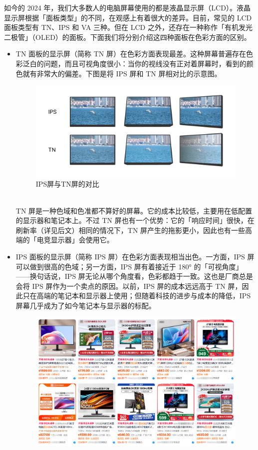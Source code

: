 如今的 2024 年，我们大多数人的电脑屏幕使用的都是液晶显示屏（LCD）。液晶显示屏根据「面板类型」的不同，在观感上有着很大的差异。目前，常见的 LCD 面板类型有 TN、IPS 和 VA 三种。但在 LCD 之外，还存在一种称作「有机发光二极管」（OLED）的面板。下面我们将分别介绍这四种面板在色彩方面的区别。

\begin{itemize}
  \item TN 面板的显示屏（简称 TN 屏）在色彩方面表现最差。这种屏幕普遍存在色彩泛白的问题，而且可视角度很小：当你的视线没有正对着屏幕时，看到的颜色就有非常大的偏差。下图是将 IPS 屏和 TN 屏相对比的示意图。
    \begin{figure}[htb!]
      \centering
      \includegraphics[width=.85\textwidth]{assets/advanced/IPS_vs_TN.pdf}
      \caption{IPS屏与TN屏的对比}
      \label{fig:IPS_vs_TN}
    \end{figure}\\
    TN 屏是一种色域和色准都不算好的屏幕。它的成本比较低，主要用在低配置的显示器和笔记本上。不过 TN 屏也有一个优势：它的「响应时间」很快，在刷新率（详见后文）相同的情况下，TN 屏产生的拖影更小，因此也有一些高端的「电竞显示器」会使用它。
  \item IPS 面板的显示屏（简称 IPS 屏）在色彩方面表现相当出色。一方面，IPS 屏可以做到很高的色域；另一方面，IPS 屏有着接近于 180° 的「可视角度」——换句话说，IPS 屏无论从哪个角度看，色彩都趋于一致。这也是厂商总是会将 IPS 屏作为一个卖点的原因。以前，IPS 屏的成本远远高于 TN 屏，因此只在高端的笔记本和显示器上使用；但随着科技的进步与成本的降低，IPS 屏幕几乎成为了如今笔记本与显示器的标配。
    \begin{figure}[htb!]
      \centering
      \includegraphics[width=.8\textwidth]{assets/advanced/IPS_screens.png}

\end{figure}
\end{itemize}
